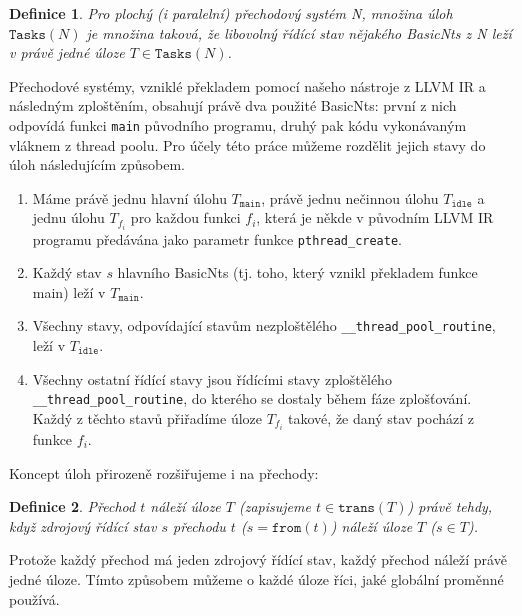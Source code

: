 \documentclass{fithesis2}
\newtheorem{definition}{Definice}
\begin{document}
\begin{definition}
Pro plochý (i paralelní) přechodový systém N, množina úloh $\texttt{Tasks}(N)$ je množina taková, že libovolný řídící stav nějakého BasicNts z N leží v právě jedné úloze $T \in \texttt{Tasks}(N)$.
\end{definition}

Přechodové systémy, vzniklé překladem pomocí našeho nástroje z LLVM IR a následným zploštěním, obsahují právě dva použité BasicNts: první z nich odpovídá funkci \texttt{main} původního programu, druhý pak kódu vykonávaným vláknem z thread poolu. Pro účely této práce můžeme rozdělit jejich stavy do úloh následujícím způsobem.

\begin{enumerate}
\item Máme právě jednu hlavní úlohu $T_{\texttt{main}}$, právě jednu nečinnou úlohu $T_{\texttt{idle}}$ a jednu úlohu $T_{f_i}$ pro každou funkci $f_i$, která je někde v původním LLVM IR programu předávána jako parametr funkce \texttt{pthread\_create}.
\item Každý stav $s$ hlavního BasicNts (tj. toho, který vznikl překladem funkce main) leží v $T_{\texttt{main}}$.
\item Všechny stavy, odpovídající stavům nezploštělého \texttt{\_\_thread\_pool\_routine}, leží v $T_{\texttt{idle}}$.
\item Všechny ostatní řídící stavy jsou řídícími stavy zploštělého \texttt{\_\_thread\_pool\_routine}, do kterého se dostaly během fáze zplošťování. Každý z těchto stavů přiřadíme úloze $T_{f_i}$ takové, že daný stav pochází z funkce $f_i$.
\end{enumerate}

Koncept úloh přirozeně rozšiřujeme i na přechody:
\begin{definition}
Přechod $t$ náleží úloze $T$ (zapisujeme $t \in \texttt{trans}(T)$) právě tehdy, když zdrojový řídící stav $s$ přechodu $t$ ($s = \texttt{from}(t)$) náleží úloze $T$ ($s \in T$).
\end{definition}
Protože každý přechod má jeden zdrojový řídící stav, každý přechod náleží právě jedné úloze. Tímto způsobem můžeme o každé úloze říci, jaké globální proměnné používá.
\end{document}

